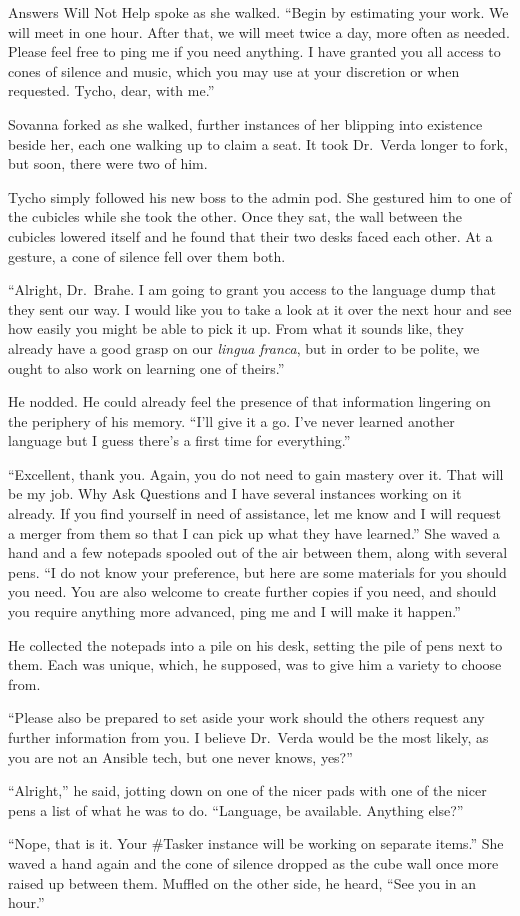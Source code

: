 Answers Will Not Help spoke as she walked. ``Begin by estimating your work. We will meet in one hour. After that, we will meet twice a day, more often as needed. Please feel free to ping me if you need anything. I have granted you all access to cones of silence and music, which you may use at your discretion or when requested. Tycho, dear, with me.''

Sovanna forked as she walked, further instances of her blipping into existence beside her, each one walking up to claim a seat. It took Dr.~Verda longer to fork, but soon, there were two of him.

Tycho simply followed his new boss to the admin pod. She gestured him to one of the cubicles while she took the other. Once they sat, the wall between the cubicles lowered itself and he found that their two desks faced each other. At a gesture, a cone of silence fell over them both.

``Alright, Dr.~Brahe. I am going to grant you access to the language dump that they sent our way. I would like you to take a look at it over the next hour and see how easily you might be able to pick it up. From what it sounds like, they already have a good grasp on our \emph{lingua franca}, but in order to be polite, we ought to also work on learning one of theirs.''

He nodded. He could already feel the presence of that information lingering on the periphery of his memory. ``I'll give it a go. I've never learned another language but I guess there's a first time for everything.''

``Excellent, thank you. Again, you do not need to gain mastery over it. That will be my job. Why Ask Questions and I have several instances working on it already. If you find yourself in need of assistance, let me know and I will request a merger from them so that I can pick up what they have learned.'' She waved a hand and a few notepads spooled out of the air between them, along with several pens. ``I do not know your preference, but here are some materials for you should you need. You are also welcome to create further copies if you need, and should you require anything more advanced, ping me and I will make it happen.''

He collected the notepads into a pile on his desk, setting the pile of pens next to them. Each was unique, which, he supposed, was to give him a variety to choose from.

``Please also be prepared to set aside your work should the others request any further information from you. I believe Dr.~Verda would be the most likely, as you are not an Ansible tech, but one never knows, yes?''

``Alright,'' he said, jotting down on one of the nicer pads with one of the nicer pens a list of what he was to do. ``Language, be available. Anything else?''

``Nope, that is it. Your \#Tasker instance will be working on separate items.'' She waved a hand again and the cone of silence dropped as the cube wall once more raised up between them. Muffled on the other side, he heard, ``See you in an hour.''
